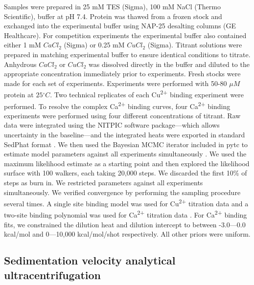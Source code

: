 Samples were prepared in 25 mM TES (Sigma), 100 mM NaCl (Thermo Scientific),
buffer at pH 7.4. Protein was thawed from a frozen stock and exchanged
into the experimental buffer using NAP-25 desalting columns (GE Healthcare).
For competition experiments the experimental buffer also contained
either 1 mM $CaCl_{2}$ (Sigma) or 0.25 mM $CuCl_{2}$ (Sigma). Titrant
solutions were prepared in matching experimental buffer to ensure
identical conditions to titrate. Anhydrous $CaCl_{2}$ or $CuCl_{2}$
was dissolved directly in the buffer and diluted to the appropriate
concentration immediately prior to experiments. Fresh stocks were
made for each set of experiments. Experiments were performed with
50-80 $\mu M$ protein at $25{^\circ}C$. Two technical replicates
of each Cu\textsuperscript{2+} binding experiment were performed.
To resolve the complex Ca\textsuperscript{2+} binding curves, four
Ca\textsuperscript{2+} binding experiments were performed using four
different concentrations of titrant. Raw data were integrated using
the NITPIC software package---which allows uncertainty in the baseline---and
the integrated heats were exported in standard SedPhat format \cite{keller_high-precision_2012}.
We then used the Bayesian MCMC iterator included in pytc to estimate
model parameters against all experiments simultaneously \cite{noauthor_pytc:_2017}.
We used the maximum likelihood estimate as a starting point and then
explored the likelihood surface with 100 walkers, each taking 20,000
steps. We discarded the first 10\% of steps as burn in. We restricted
parameters against all experiments simultaneously. We verified convergence
by performing the sampling procedure several times. A single site
binding model was used for Cu\textsuperscript{2+} titration data
and a two-site binding polynomial was used for Ca\textsuperscript{2+} 
titration data \cite{wiseman_rapid_1989,freire_chapter_2009}. For
Ca\textsuperscript{2+} binding fits, we constrained the dilution
heat and dilution intercept to between -3.0---0.0 kcal/mol and 0---10,000
kcal/mol/shot respectively. All other priors were uniform. 

\subsection{Sedimentation velocity analytical ultracentrifugation}

